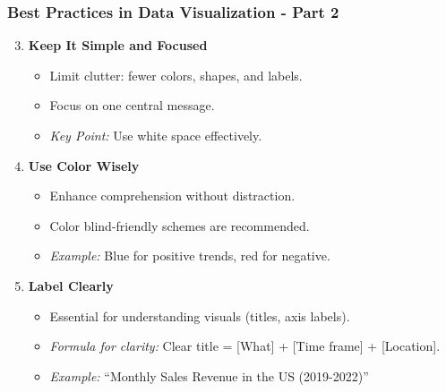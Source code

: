 \documentclass[aspectratio=169]{beamer}
\begin{document}
\begin{frame}[fragile]
    \frametitle{Best Practices in Data Visualization - Part 2}
    \begin{enumerate}
        \setcounter{enumi}{2}
        \item \textbf{Keep It Simple and Focused}
            \begin{itemize}
                \item Limit clutter: fewer colors, shapes, and labels.
                \item Focus on one central message.
                \item \textit{Key Point:} Use white space effectively.
            \end{itemize}

        \item \textbf{Use Color Wisely}
            \begin{itemize}
                \item Enhance comprehension without distraction.
                \item Color blind-friendly schemes are recommended.
                \item \textit{Example:} Blue for positive trends, red for negative.
            \end{itemize}
        
        \item \textbf{Label Clearly}
            \begin{itemize}
                \item Essential for understanding visuals (titles, axis labels).
                \item \textit{Formula for clarity:} Clear title = [What] + [Time frame] + [Location]. 
                \item \textit{Example:} “Monthly Sales Revenue in the US (2019-2022)”
            \end{itemize}
    \end{enumerate}
\end{frame}
\end{document}
